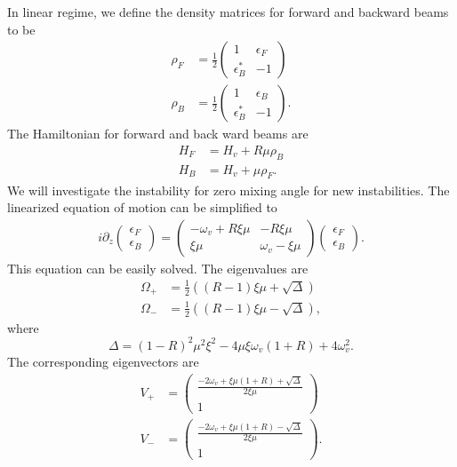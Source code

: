 In linear regime, we define the density matrices for forward and backward beams to be
\begin{align*}
   \rho_F &= \frac{1}{2} \begin{pmatrix}
   1 & \epsilon_F \\
   \epsilon_B^* & -1
   \end{pmatrix} \\
   \rho_B &= \frac{1}{2} \begin{pmatrix}
   1 & \epsilon_B \\
   \epsilon_B^* & -1
   \end{pmatrix}.
\end{align*}
The Hamiltonian for forward and back ward beams are
\begin{align*}
   H_F &= H_v + R \mu \rho_B \\
   H_B &= H_v + \mu \rho_F.
\end{align*}
We will investigate the instability for zero mixing angle for new instabilities. The linearized equation of motion can be simplified to
\begin{align*}
   i\partial_z \begin{pmatrix}
   \epsilon_F \\
   \epsilon_B
   \end{pmatrix} = \begin{pmatrix}
   -\omega_v + R \xi \mu & - R \xi \mu \\
   \xi \mu & \omega_v - \xi \mu
   \end{pmatrix} \begin{pmatrix}
   \epsilon_F \\
   \epsilon_B
   \end{pmatrix}.
\end{align*}
This equation can be easily solved. The eigenvalues are
\begin{align*}
   \Omega_+ &= \frac{1}{2} ( (R-1)\xi\mu + \sqrt{\Delta} ) \\
   \Omega_- &= \frac{1}{2} ( (R-1)\xi\mu - \sqrt{\Delta} ),
\end{align*}
where
\begin{equation}
   \Delta = (1-R)^2 \mu^2 \xi^2 - 4\mu\xi \omega_v (1+R) + 4\omega_v^2.
\end{equation}
The corresponding eigenvectors are
\begin{align*}
   V_+ &=\begin{pmatrix}
   \frac{ -2\omega_v + \xi \mu (1+R) + \sqrt{\Delta} }{2\xi\mu} \\
   1
   \end{pmatrix} \\
   V_- &=\begin{pmatrix}
   \frac{ -2\omega_v + \xi \mu (1+R) - \sqrt{\Delta} }{2\xi\mu} \\
   1
   \end{pmatrix}.
\end{align*}
